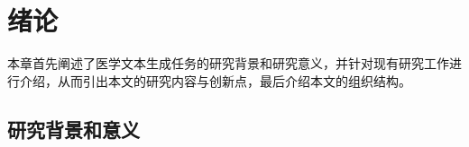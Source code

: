 
\chapter{绪论}

本章首先阐述了医学文本生成任务的研究背景和研究意义，并针对现有研究工作进行介绍，从而引出本文的研究内容与创新点，最后介绍本文的组织结构。

\section{研究背景和意义}



%
%
%
